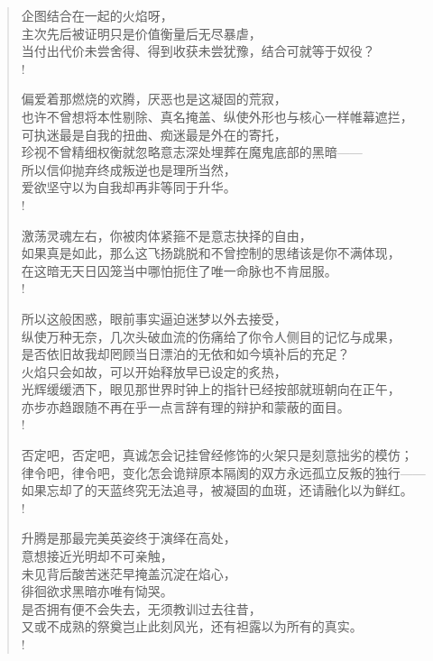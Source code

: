 \documentclass[UTF8, 12pt, a4paper]{ctexrep} %
\begin{document}
\begin{verse}
企图结合在一起的火焰呀，\\
主次先后被证明只是价值衡量后无尽暴虐，\\
当付出代价未尝舍得、得到收获未尝犹豫，结合可就等于奴役？\\!

偏爱着那燃烧的欢腾，厌恶也是这凝固的荒寂，\\
也许不曾想将本性剔除、真名掩盖、纵使外形也与核心一样帷幕遮拦，\\
可执迷最是自我的扭曲、痴迷最是外在的寄托，\\
珍视不曾精细权衡就忽略意志深处埋葬在魔鬼底部的黑暗——\\
所以信仰抛弃终成叛逆也是理所当然，\\
爱欲坚守以为自我却再非等同于升华。\\!

激荡灵魂左右，你被肉体紧箍不是意志抉择的自由，\\
如果真是如此，那么这飞扬跳脱和不曾控制的思绪该是你不满体现，\\
在这暗无天日囚笼当中哪怕扼住了唯一命脉也不肯屈服。\\!

所以这般困惑，眼前事实逼迫迷梦以外去接受，\\
纵使万种无奈，几次头破血流的伤痛给了你令人侧目的记忆与成果，\\
是否依旧故我却罔顾当日漂泊的无依和如今填补后的充足？\\
火焰只会如故，可以开始释放早已设定的炙热，\\
光辉缓缓洒下，眼见那世界时钟上的指针已经按部就班朝向在正午，\\
亦步亦趋跟随不再在乎一点言辞有理的辩护和蒙蔽的面目。\\!

否定吧，否定吧，真诚怎会记挂曾经修饰的火架只是刻意拙劣的模仿；\\
律令吧，律令吧，变化怎会诡辩原本隔阂的双方永远孤立反叛的独行——\\
如果忘却了的天蓝终究无法追寻，被凝固的血斑，还请融化以为鲜红。\\!

升腾是那最完美英姿终于演绎在高处，\\
意想接近光明却不可亲触，\\
未见背后酸苦迷茫早掩盖沉淀在焰心，\\
徘徊欲求黑暗亦唯有恸哭。\\
是否拥有便不会失去，无须教训过去往昔，\\
又或不成熟的祭奠岂止此刻风光，还有袒露以为所有的真实。\\!


\end{verse}
\end{document}
